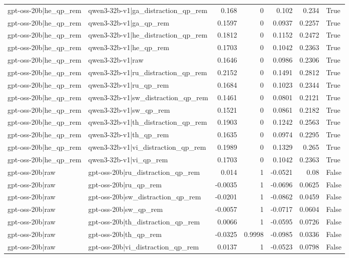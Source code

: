 \begin{table}
\begin{tabular}{l l r r r r l}
gpt-oss-20b|he_qp_rem & qwen3-32b-v1|ga_distraction_qp_rem & 0.168 & 0 & 0.102 & 0.234 & True \\
gpt-oss-20b|he_qp_rem & qwen3-32b-v1|ga_qp_rem & 0.1597 & 0 & 0.0937 & 0.2257 & True \\
gpt-oss-20b|he_qp_rem & qwen3-32b-v1|he_distraction_qp_rem & 0.1812 & 0 & 0.1152 & 0.2472 & True \\
gpt-oss-20b|he_qp_rem & qwen3-32b-v1|he_qp_rem & 0.1703 & 0 & 0.1042 & 0.2363 & True \\
gpt-oss-20b|he_qp_rem & qwen3-32b-v1|raw & 0.1646 & 0 & 0.0986 & 0.2306 & True \\
gpt-oss-20b|he_qp_rem & qwen3-32b-v1|ru_distraction_qp_rem & 0.2152 & 0 & 0.1491 & 0.2812 & True \\
gpt-oss-20b|he_qp_rem & qwen3-32b-v1|ru_qp_rem & 0.1684 & 0 & 0.1023 & 0.2344 & True \\
gpt-oss-20b|he_qp_rem & qwen3-32b-v1|sw_distraction_qp_rem & 0.1461 & 0 & 0.0801 & 0.2121 & True \\
gpt-oss-20b|he_qp_rem & qwen3-32b-v1|sw_qp_rem & 0.1521 & 0 & 0.0861 & 0.2182 & True \\
gpt-oss-20b|he_qp_rem & qwen3-32b-v1|th_distraction_qp_rem & 0.1903 & 0 & 0.1242 & 0.2563 & True \\
gpt-oss-20b|he_qp_rem & qwen3-32b-v1|th_qp_rem & 0.1635 & 0 & 0.0974 & 0.2295 & True \\
gpt-oss-20b|he_qp_rem & qwen3-32b-v1|vi_distraction_qp_rem & 0.1989 & 0 & 0.1329 & 0.265 & True \\
gpt-oss-20b|he_qp_rem & qwen3-32b-v1|vi_qp_rem & 0.1703 & 0 & 0.1042 & 0.2363 & True \\
gpt-oss-20b|raw & gpt-oss-20b|ru_distraction_qp_rem & 0.014 & 1 & -0.0521 & 0.08 & False \\
gpt-oss-20b|raw & gpt-oss-20b|ru_qp_rem & -0.0035 & 1 & -0.0696 & 0.0625 & False \\
gpt-oss-20b|raw & gpt-oss-20b|sw_distraction_qp_rem & -0.0201 & 1 & -0.0862 & 0.0459 & False \\
gpt-oss-20b|raw & gpt-oss-20b|sw_qp_rem & -0.0057 & 1 & -0.0717 & 0.0604 & False \\
gpt-oss-20b|raw & gpt-oss-20b|th_distraction_qp_rem & 0.0066 & 1 & -0.0595 & 0.0726 & False \\
gpt-oss-20b|raw & gpt-oss-20b|th_qp_rem & -0.0325 & 0.9998 & -0.0985 & 0.0336 & False \\
gpt-oss-20b|raw & gpt-oss-20b|vi_distraction_qp_rem & 0.0137 & 1 & -0.0523 & 0.0798 & False \\

\end{tabular}
\end{table}

